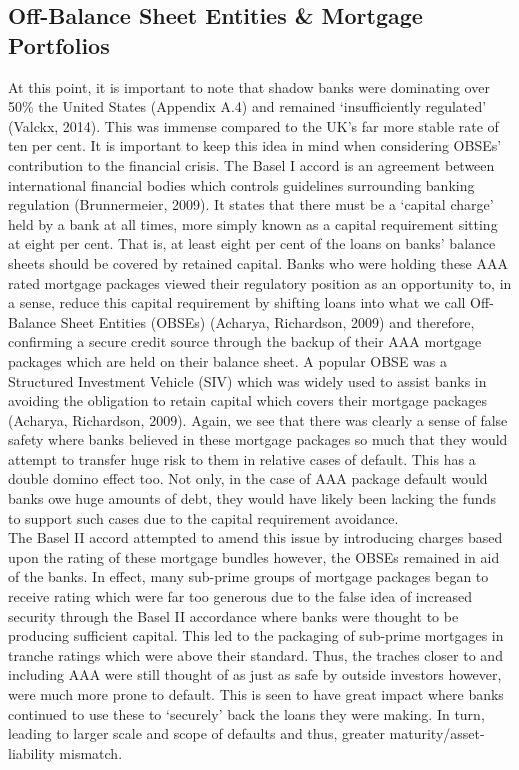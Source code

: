 \documentclass[11pt, english]{article}
\begin{document}
	\subsection{Off-Balance Sheet Entities \& Mortgage Portfolios}

	At this point, it is important to note that shadow banks were dominating over 50\% the United States (Appendix A.4) and remained `insufficiently regulated' (Valckx, 2014). This was immense compared to the UK’s far more stable rate of ten per cent. It is important to keep this idea in mind when considering OBSEs’ contribution to the financial crisis. The Basel I accord is an agreement between international financial bodies which controls guidelines surrounding banking regulation (Brunnermeier, 2009). It states that there must be a `capital charge' held by a bank at all times, more simply known as a capital requirement sitting at eight per cent. That is, at least eight per cent of the loans on banks’ balance sheets should be covered by retained capital. Banks who were holding these AAA rated mortgage packages viewed their regulatory position as an opportunity to, in a sense, reduce this capital requirement by shifting loans into what we call Off-Balance Sheet Entities (OBSEs) (Acharya, Richardson, 2009) and therefore, confirming a secure credit source through the backup of their AAA mortgage packages which are held on their balance sheet. A popular OBSE was a Structured Investment Vehicle (SIV) which was widely used to assist banks in avoiding the obligation to retain capital which covers their mortgage packages (Acharya, Richardson, 2009). Again, we see that there was clearly a sense of false safety where banks believed in these mortgage packages so much that they would attempt to transfer huge risk to them in relative cases of default. This has a double domino effect too. Not only, in the case of AAA package default would banks owe huge amounts of debt, they would have likely been lacking the funds to support such cases due to the capital requirement avoidance.\\

	The Basel II accord attempted to amend this issue by introducing charges based upon the rating of these mortgage bundles however, the OBSEs remained in aid of the banks. In effect, many sub-prime groups of mortgage packages began to receive rating which were far too generous due to the false idea of increased security through the Basel II accordance where banks were thought to be producing sufficient capital. This led to the packaging of sub-prime mortgages in tranche ratings which were above their standard. Thus, the traches closer to and including AAA were still thought of as just as safe by outside investors however, were much more prone to default. This is seen to have great impact where banks continued to use these to `securely' back the loans they were making. In turn, leading to larger scale and scope of defaults and thus, greater maturity/asset-liability mismatch.\\
	
\end{document}
